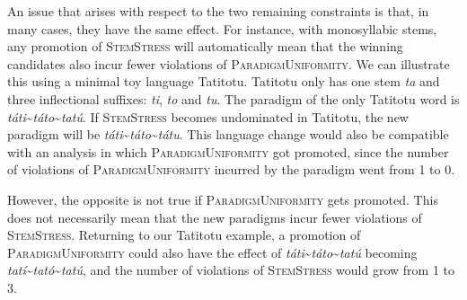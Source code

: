 \documentclass[output=paper,modfonts,nonflat
]{langsci/langscibook}
\begin{document}
An issue that arises with respect to the two remaining constraints is that, in many cases, they have the same effect. For instance, with monosyllabic stems, any promotion of \textsc{StemStress} will automatically mean that the winning candidates also incur fewer violations of \textsc{ParadigmUniformity}. We can illustrate this using a minimal toy language Tatitotu. Tatitotu only has one stem \textit{ta} and three inflectional suffixes: \textit{ti}, \textit{to} and \textit{tu}. The paradigm of the only Tatitotu word is \textit{táti}\textasciitilde{}\textit{táto}\textasciitilde{}\textit{tatú}. If \textsc{StemStress} becomes undominated in Tatitotu, the new paradigm will be \textit{táti}\textasciitilde{}\textit{táto}\textasciitilde{}\textit{tátu}. This language change would also be compatible with an analysis in which \textsc{ParadigmUniformity} got promoted, since the number of violations of \textsc{ParadigmUniformity} incurred by the paradigm went from 1 to 0. 

However, the opposite is not true if \textsc{ParadigmUniformity} gets promoted. This does not necessarily mean that the new paradigms incur fewer violations of \textsc{StemStress}. Returning to our Tatitotu example, a promotion of \textsc{ParadigmUniformity} could also have the effect of \textit{táti}\textasciitilde{}\textit{táto}\textasciitilde{}\textit{tatú} becoming \textit{tatí}\textasciitilde{}\textit{tató}\textasciitilde{}\textit{tatú}, and the number of violations of \textsc{StemStress} would grow from 1 to 3. 
\end{document}
